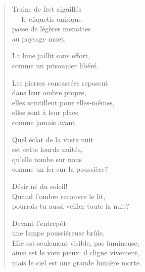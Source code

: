 \documentclass[11pt]{extbook}
\newcommand*{\centeredornament}{\centerline{\pgfornament[width=6cm]{88}}}
\begin{document}



\begin{verse}
  Trains de fret aiguillés \\
  --- le cliquetis onirique \\
  passe de légères menottes \\
  au paysage muet.

  La lune jaillit sans effort, \\
  comme un prisonnier libéré.

  Les pierres concassées reposent \\
  dans leur ombre propre, \\
  elles scintillent pour elles-mêmes, \\
  elles sont à leur place \\
  comme jamais avant.

  Quel éclat de la vaste nuit \\
  est cette lourde nuitée, \\
  qu'elle tombe sur nous \\
  comme un fer sur la poussière?

  Désir né du soleil! \\
  Quand l'ombre recouvre le lit, \\
  pourrais-tu aussi veiller toute la nuit?

  Devant l'entrepôt \\
  une lampe poussiéreuse brûle. \\
  Elle est seulement visible, pas lumineuse; \\
  ainsi est le vœu pieux: il cligne vivement, \\
  mais le ciel est une grande lumière morte.
\end{verse}

\newpage

\vspace*{-15mm}
\centeredornament


\end{document}
